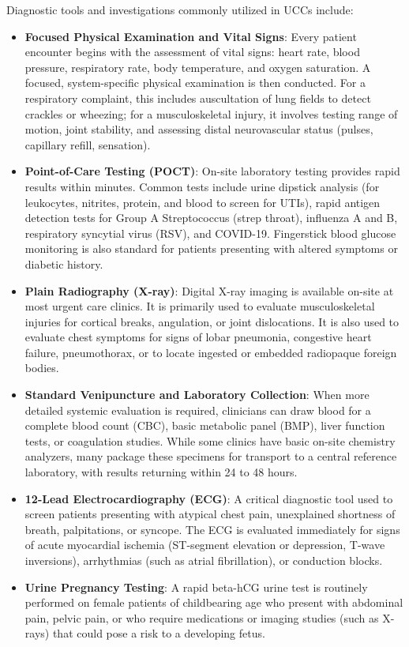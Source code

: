 Diagnostic tools and investigations commonly utilized in UCCs include:

\begin{itemize}
  \item \textbf{Focused Physical Examination and Vital Signs}: Every patient encounter begins with the assessment of vital signs: heart rate, blood pressure, respiratory rate, body temperature, and oxygen saturation. A focused, system-specific physical examination is then conducted. For a respiratory complaint, this includes auscultation of lung fields to detect crackles or wheezing; for a musculoskeletal injury, it involves testing range of motion, joint stability, and assessing distal neurovascular status (pulses, capillary refill, sensation).
  \item \textbf{Point-of-Care Testing (POCT)}: On-site laboratory testing provides rapid results within minutes. Common tests include urine dipstick analysis (for leukocytes, nitrites, protein, and blood to screen for UTIs), rapid antigen detection tests for Group A Streptococcus (strep throat), influenza A and B, respiratory syncytial virus (RSV), and COVID-19. Fingerstick blood glucose monitoring is also standard for patients presenting with altered symptoms or diabetic history.
  \item \textbf{Plain Radiography (X-ray)}: Digital X-ray imaging is available on-site at most urgent care clinics. It is primarily used to evaluate musculoskeletal injuries for cortical breaks, angulation, or joint dislocations. It is also used to evaluate chest symptoms for signs of lobar pneumonia, congestive heart failure, pneumothorax, or to locate ingested or embedded radiopaque foreign bodies.
  \item \textbf{Standard Venipuncture and Laboratory Collection}: When more detailed systemic evaluation is required, clinicians can draw blood for a complete blood count (CBC), basic metabolic panel (BMP), liver function tests, or coagulation studies. While some clinics have basic on-site chemistry analyzers, many package these specimens for transport to a central reference laboratory, with results returning within 24 to 48 hours.
  \item \textbf{12-Lead Electrocardiography (ECG)}: A critical diagnostic tool used to screen patients presenting with atypical chest pain, unexplained shortness of breath, palpitations, or syncope. The ECG is evaluated immediately for signs of acute myocardial ischemia (ST-segment elevation or depression, T-wave inversions), arrhythmias (such as atrial fibrillation), or conduction blocks.
  \item \textbf{Urine Pregnancy Testing}: A rapid beta-hCG urine test is routinely performed on female patients of childbearing age who present with abdominal pain, pelvic pain, or who require medications or imaging studies (such as X-rays) that could pose a risk to a developing fetus.
\end{itemize}

